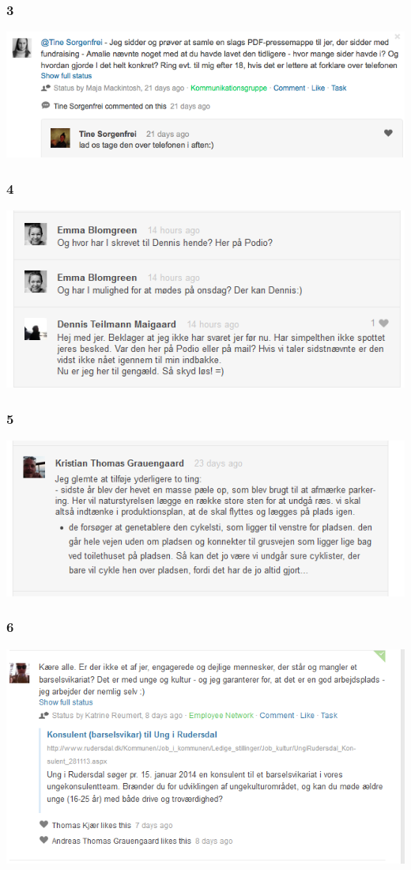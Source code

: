 \subsubsection{3}
\label{podio_3}
\includegraphics[scale=0.7]{Pictures/Podio_3.png}

\subsubsection{4}
\label{podio_4}
\includegraphics[scale=0.7]{Pictures/Podio_4.png}

\subsubsection{5}
\label{podio_5}
\includegraphics[scale=0.7]{Pictures/Podio_5.png}

\subsubsection{6}
\label{podio_6}
\includegraphics[scale=0.7]{Pictures/Podio_6.png}

